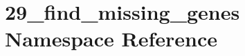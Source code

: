 \hypertarget{namespace29__find__missing__genes}{\section{29\-\_\-find\-\_\-missing\-\_\-genes Namespace Reference}
\label{namespace29__find__missing__genes}
}
